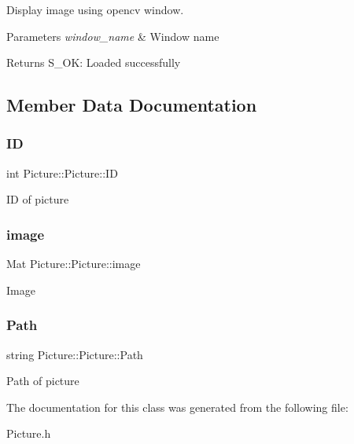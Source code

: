 Display image using opencv window. 


\begin{DoxyParams}{Parameters}
{\em window\+\_\+name} & Window name \\
\hline
\end{DoxyParams}
\begin{DoxyReturn}{Returns}
S\+\_\+\+OK\+: Loaded successfully 
\end{DoxyReturn}


\subsection{Member Data Documentation}
\mbox{\label{class_picture_1_1_picture_a96f8b585779e75511229adf4052fcb1c}} 
\subsubsection{\texorpdfstring{ID}{ID}}
{\footnotesize\ttfamily int Picture\+::\+Picture\+::\+ID\hspace{0.3cm}{\ttfamily [private]}}

ID of picture \mbox{\label{class_picture_1_1_picture_a8e9f7ddce764bd0cb7be9250ea5b70a3}} 
\subsubsection{\texorpdfstring{image}{image}}
{\footnotesize\ttfamily Mat Picture\+::\+Picture\+::image\hspace{0.3cm}{\ttfamily [private]}}

Image \mbox{\label{class_picture_1_1_picture_aa2a2802fbbad4a814012250c6dd1aa16}} 
\subsubsection{\texorpdfstring{Path}{Path}}
{\footnotesize\ttfamily string Picture\+::\+Picture\+::\+Path\hspace{0.3cm}{\ttfamily [private]}}

Path of picture 

The documentation for this class was generated from the following file\+:\begin{DoxyCompactItemize}
\item 
Picture.\+h\end{DoxyCompactItemize}
